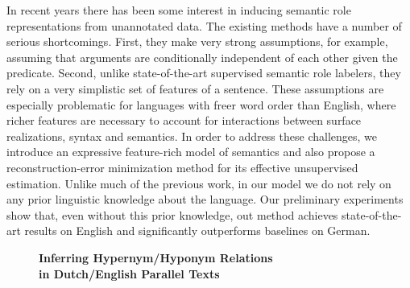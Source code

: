 \documentclass[10pt, a4paper, twopage, headinclude, footinclude, BCOR5mm]{book}
\begin{document}
\begin{table}[t!]
\end{table} 
\noindent
In recent years there has been some interest in inducing semantic role representations  from unannotated data. The existing methods have a number of serious shortcomings. First, they make very strong assumptions, for example, assuming that arguments are conditionally independent of each other given the predicate. Second, unlike state-of-the-art supervised semantic role labelers, they rely on a very simplistic set of features of a sentence. These assumptions are especially problematic for languages with freer word order than English, where richer features are necessary to account for interactions between surface realizations, syntax and semantics.  In order to address these challenges, we introduce an expressive feature-rich model of semantics and also propose a reconstruction-error minimization method for its effective unsupervised estimation.  Unlike much of the previous work, in our model we do not rely on any prior linguistic knowledge about the language.  Our preliminary experiments show that, even without this prior knowledge, out method achieves state-of-the-art results on English and significantly outperforms baselines on German.   

\newpage

\begin{figure}[t!]
\centering
\large\textbf{Inferring Hypernym/Hyponym Relations \\ in Dutch/English Parallel Texts}
\vspace*{0.5cm}
\end{figure}
\end{document}
